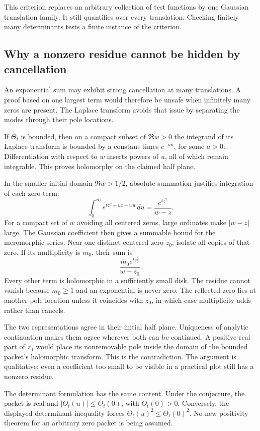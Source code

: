 This criterion replaces an arbitrary collection of test functions by one Gaussian translation family. It still quantifies over every translation. Checking finitely many determinants tests a finite instance of the criterion.

\subsection{Why a nonzero residue cannot be hidden by cancellation}

An exponential sum may exhibit strong cancellation at many translations. A proof based on one largest term would therefore be unsafe when infinitely many zeros are present. The Laplace transform avoids that issue by separating the modes through their pole locations.

If \(\Theta_t\) is bounded, then on a compact subset of \(\Re w>0\) the integrand of its Laplace transform is bounded by a constant times \(e^{-au}\), for some \(a>0\). Differentiation with respect to \(w\) inserts powers of \(u\), all of which remain integrable. This proves holomorphy on the claimed half plane.

In the smaller initial domain \(\Re w>1/2\), absolute summation justifies integration of each zero term:
\[
\int_0^\infty e^{tz^2+uz-wu}\,du
=\frac{e^{tz^2}}{w-z}.
\]
For a compact set of \(w\) avoiding all centered zeros, large ordinates make \(|w-z|\) large. The Gaussian coefficient then gives a summable bound for the meromorphic series. Near one distinct centered zero \(z_0\), isolate all copies of that zero. If its multiplicity is \(m_0\), their sum is
\[
\frac{m_0e^{tz_0^2}}{w-z_0}.
\]
Every other term is holomorphic in a sufficiently small disk. The residue cannot vanish because \(m_0\ge1\) and an exponential is never zero. The reflected zero lies at another pole location unless it coincides with \(z_0\), in which case multiplicity adds rather than cancels.

The two representations agree in their initial half plane. Uniqueness of analytic continuation makes them agree wherever both can be continued. A positive real part of \(z_0\) would place its nonremovable pole inside the domain of the bounded packet's holomorphic transform. This is the contradiction. The argument is qualitative: even a coefficient too small to be visible in a practical plot still has a nonzero residue.

The determinant formulation has the same content. Under the conjecture, the packet is real and \(|\Theta_t(u)|\le\Theta_t(0)\), with \(\Theta_t(0)>0\). Conversely, the displayed determinant inequality forces \(\Theta_t(u)^2\le\Theta_t(0)^2\). No new positivity theorem for an arbitrary zero packet is being assumed.

